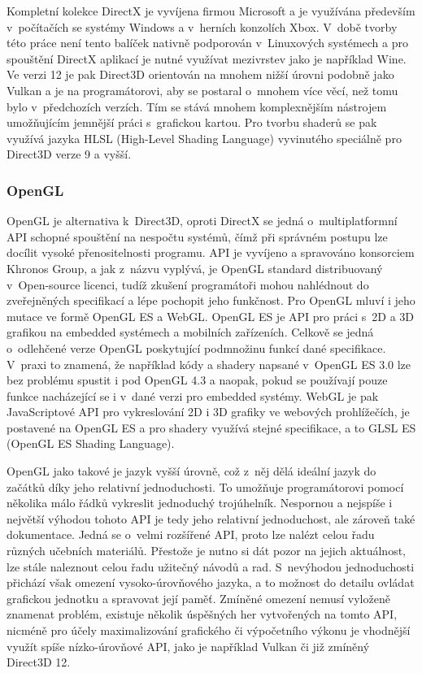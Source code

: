 Kompletní kolekce DirectX je vyvíjena firmou Microsoft a je využívána především v~počítačích se systémy Windows a v~herních konzolích Xbox. V~době tvorby této práce není tento balíček nativně podporován v~Linuxových systémech a pro spouštění DirectX aplikací je nutné využívat mezivrstev jako je například Wine. Ve verzi 12 je pak Direct3D orientován na mnohem nižší úrovni podobně jako Vulkan a je na programátorovi, aby se postaral o~mnohem více věcí, než tomu bylo v~předchozích verzích. Tím se stává mnohem komplexnějším nástrojem umožňujícím jemnější práci s~grafickou kartou. Pro tvorbu shaderů se pak využívá jazyka HLSL (High-Level Shading Language) vyvinutého speciálně pro Direct3D verze 9 a vyšší. \cite{parrish_2016} \cite{grantmestrength}
\subsubsection{OpenGL}
OpenGL je alternativa k~Direct3D, oproti DirectX se jedná o~multiplatformní API schopné spouštění na nespočtu systémů, čímž při správném postupu lze docílit vysoké přenositelnosti programu. API je vyvíjeno a spravováno konsorciem Khronos Group, a jak z~názvu vyplývá, je OpenGL standard distribuovaný v~Open-source licenci, tudíž zkušení programátoři mohou nahlédnout do zveřejněných specifikací a lépe pochopit jeho funkčnost. Pro OpenGL mluví i jeho mutace ve formě OpenGL ES a WebGL. OpenGL ES je API pro práci s~2D a 3D grafikou na embedded systémech a mobilních zařízeních. Celkově se jedná o~odlehčené verze OpenGL poskytující podmnožinu funkcí dané specifikace. V~praxi to znamená, že například kódy a shadery napsané v~OpenGL ES 3.0 lze bez problému spustit i pod OpenGL 4.3 a naopak, pokud se používají pouze funkce nacházející se i v~dané verzi pro embedded systémy. WebGL je pak JavaScriptové API pro vykreslování 2D i 3D grafiky ve webových prohlížečích, je postavené na OpenGL ES a pro shadery využívá stejné specifikace, a to GLSL ES (OpenGL ES Shading Language). \cite{opengl} \cite{webgl} \cite{group}

OpenGL jako takové je jazyk vyšší úrovně, což z~něj dělá ideální jazyk do začátků díky jeho relativní jednoduchosti. To umožňuje programátorovi pomocí několika málo řádků vykreslit jednoduchý trojúhelník. Nespornou a nejspíše i největší výhodou tohoto API je tedy jeho relativní jednoduchost, ale zároveň také dokumentace. Jedná se o~velmi rozšířené API, proto lze nalézt celou řadu různých učebních materiálů. Přestože je nutno si dát pozor na jejich aktuálnost, lze stále naleznout celou řadu užitečný návodů a rad. S~nevýhodou jednoduchosti přichází však omezení vysoko-úrovňového jazyka, a to možnost do detailu ovládat grafickou jednotku a spravovat její paměť. Zmíněné omezení nemusí vyloženě znamenat problém, existuje několik úspěšných her vytvořených na tomto API, nicméně pro účely maximalizování grafického či výpočetního výkonu je vhodnější využít spíše nízko-úrovňové API, jako je například Vulkan či již zmíněný Direct3D 12.


